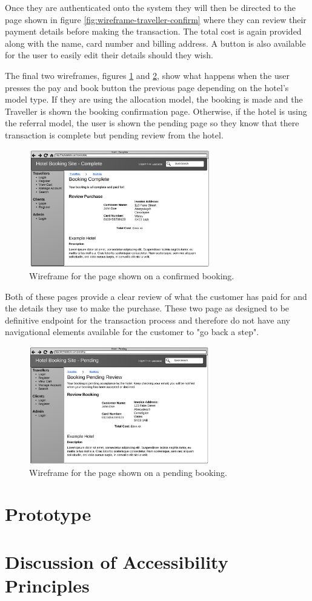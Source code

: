 \documentclass{article}
\begin{document}
Once they are authenticated onto the system they will then be directed to the page shown in figure \ref{fig:wireframe-traveller-confirm} where they can review their payment details before making the transaction. The total cost is again provided along with the name, card number and billing address. A button is also available for the user to easily edit their details should they wish.

The final two wireframes, figures \ref{fig:wireframe-traveller-booked} and \ref{fig:wireframe-traveller-pending}, show what happens when the user presses the pay and book button the previous page depending on the hotel's model type. If they are using the allocation model, the booking is made and the Traveller is shown the booking confirmation page. Otherwise, if the hotel is using the referral model, the user is shown the pending page so they know that there transaction is complete but pending review from the hotel.

\begin{figure}[H]
\centering
\includegraphics[width=0.7\textwidth]{img/wireframes/Booked.png}
\caption{Wireframe for the page shown on a confirmed booking.}
\label{fig:wireframe-traveller-booked}
\end{figure}

Both of these pages provide a clear review of what the customer has paid for and the details they use to make the purchase. These two page as designed to be definitive endpoint for the transaction process and therefore do not have any navigational elements available for the customer to "go back a step".

\begin{figure}[H]
\centering
\includegraphics[width=0.7\textwidth]{img/wireframes/Pending.png}
\caption{Wireframe for the page shown on a pending booking.}
\label{fig:wireframe-traveller-pending}
\end{figure}

\section{Prototype}


\section{Discussion of Accessibility Principles}
\end{document}
